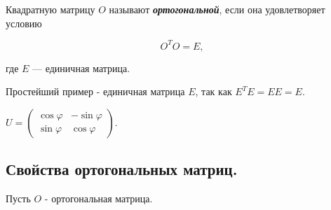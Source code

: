 \begin{definition}
    Квадратную матрицу $O$ называют \textbf{\textit{ортогональной}}, если она удовлетворяет условию

    \begin{equation}
        O^TO = E,
        \label{eq:equation_33_1}
    \end{equation}

    где $E$ — единичная матрица.
\end{definition}

\begin{example}
    Простейший пример - единичная матрица $E$, так как $E^TE = EE = E$.
\end{example}

\begin{example}
    $U = \begin{pmatrix}
    \cos \varphi & -\sin \varphi \\
    \sin \varphi & \cos \varphi
    \end{pmatrix}$.
\end{example}

\subsection*{Свойства ортогональных матриц.}

Пусть $O$ - ортогональная матрица.

